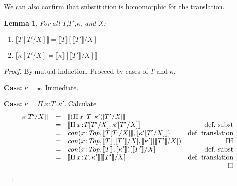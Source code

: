 \documentclass{article}
\newcommand{\abs}[4]{{#1}\, #2\! : \! #3.\, #4}
\newcommand{\interp}[1]{\llbracket #1 \rrbracket}
\newcommand{\startcase}[1]{\vspace{#1} \noindent\textbf{\underline{Case:}}}
\newtheorem{lemma}[theorem]{Lemma}
\begin{document}
We can also confirm that substitution is homomorphic for the translation.
\begin{lemma}
  \label{thm:stlc-subst-type}
  For all \(T\),\(T'\),\(\kappa\), and \(X\):
  \begin{enumerate}
  \item  \(\interp{T[T'/X]} = \interp{T}[\interp{T'}/X]\)
    
  \item \(\interp{\kappa[T'/X] = \interp{\kappa}[\interp{T'}/X]}\)
  \end{enumerate}

\end{lemma}
\begin{proof}
  By mutual induction. Proceed by cases of \(T\) and \(\kappa\).
  
  \startcase{.2cm} \(\kappa = \star\). Immediate.

  \startcase{.2cm} \(\kappa = \abs{\Pi}{x}{T}{\kappa'}\).
  Calculate
  \[
    \begin{array}{lclr}
      \interp{\kappa[T'/X]}
      & =
      & \interp{(\abs{\Pi}{x}{T}{\kappa'})[T'/X]}
      &
      \\
      & =
      & \interp{\abs{\Pi}{x}{T[T'/X]}{\kappa'[T'/X]}}
      & \text{def.\ subst}
      \\
      & =
      & \mathit{con}(x\!:\!\mathit{Top}, \interp{T[T'/X]},
        \interp{\kappa'[T'/X]})
      & \text{def.\ translation}
      \\
      & =
      & \mathit{con}(x\!:\!\mathit{Top},\interp{T}[\interp{T'}/X],\interp{\kappa'}[\interp{T'}/X])
      & \text{IH}
      \\
      & =
      &
        \mathit{con}(x\!:\!\mathit{Top},\interp{T},\interp{\kappa'})[\interp{T'}/X]
      & \text{def.\ subst}
      \\
      & =
      & \interp{\abs{\Pi}{x}{T}{\kappa'}}[\interp{T'}/X]
      & \text{def.\ translation}
      \\
      &
      &
      & \qed
    \end{array}
  \]


\end{proof}
\end{document}
